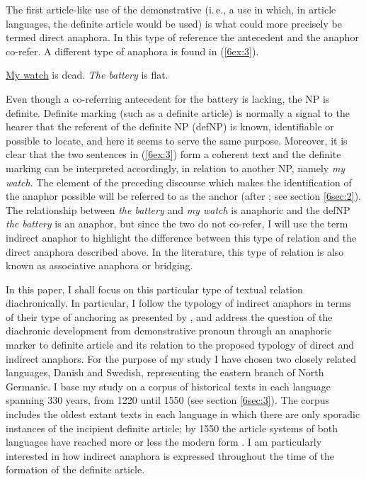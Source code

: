 \documentclass[output=paper]{langsci/langscibook}
\begin{document}
The first article-like use of the demonstrative (i.\,e., a use in which, in article languages, the definite article would be used) is what could more precisely be termed direct anaphora. In this type of reference the antecedent and the anaphor co-refer. A different type of anaphora is found in (\ref{6ex:3}).

\begin{exe}
\ex\label{6ex:3}
{\ul{My watch}} is dead. {\emph{The battery}} is flat. \citep[after][]{schwarz:00}
\end{exe}

Even though a co-referring antecedent for the battery is lacking, the NP is definite. Definite marking (such as a definite article) is normally a signal to the hearer that the referent of the definite NP (defNP) is known, identifiable or possible to locate, and here it seems to serve the same purpose. Moreover, it is clear that the two sentences in (\ref{6ex:3}) form a coherent text and the definite marking can be interpreted accordingly, in relation to another NP, namely {\emph{my watch}}. The element of the preceding discourse which makes the identification of the anaphor possible will be referred to as the anchor (after \citealt{fraurud:90}; see section \ref{6sec:2}). The relationship between {\emph{the battery}} and {\emph{my watch}} is anaphoric and the defNP {\emph{the battery}} is an anaphor, but since the two do not co-refer, I will use the term indirect anaphor to highlight the difference between this type of relation and the direct anaphora described above. In the literature, this type of relation is also known as associative anaphora or bridging. 

In this paper, I shall focus on this particular type of textual relation diachronically. In particular, I follow the typology of indirect anaphors in terms of their type of anchoring as presented by \cite{schwarz:00}, and address the question of the diachronic development from demonstrative pronoun through an anaphoric marker to definite article and its relation to the proposed typology of direct and indirect anaphors. For the purpose of my study I have chosen two closely related languages, Danish and Swedish, representing the eastern branch of North Germanic. I base my study on a corpus of historical texts in each language spanning 330 years, from 1220 until 1550 (see section  \ref{6sec:3}). The corpus includes the oldest extant texts in each language in which there are only sporadic instances of the incipient definite article; by 1550 the article systems of both languages have reached more or less the modern form \citep{strohwollin:16,skaftejensen:07}. I am particularly interested in how indirect anaphora is expressed throughout the time of the formation of the definite article. 
\end{document}
